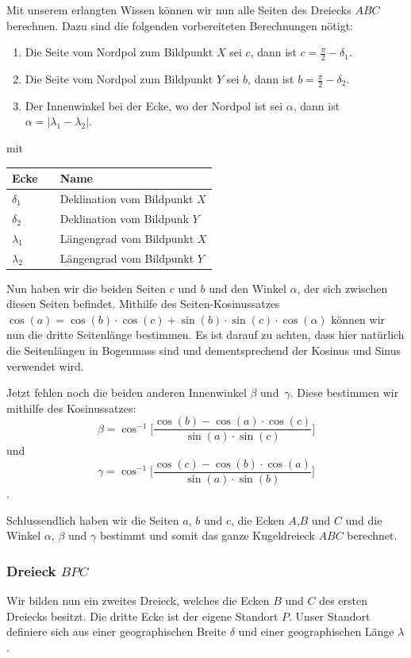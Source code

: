Mit unserem erlangten Wissen können wir nun alle Seiten des Dreiecks $ABC$ berechnen.
Dazu sind die folgenden vorbereiteten Berechnungen nötigt:

\begin{enumerate}
	\item Die Seite vom Nordpol zum Bildpunkt $X$ sei $c$, dann ist $c = \frac{\pi}{2} - \delta_1$.  
	\item Die Seite vom Nordpol zum Bildpunkt $Y$ sei $b$, dann ist $b = \frac{\pi}{2} - \delta_2$.
	\item Der Innenwinkel bei der Ecke, wo der Nordpol ist sei $\alpha$, dann ist $ \alpha = |\lambda_1 - \lambda_2|$.
\end{enumerate}

mit 
\begin{center}
	\begin{tabular}{ l l l }
		Ecke && Name  \\ 
		\hline
		$\delta_1$ && Deklination vom Bildpunkt $X$ \\  
		$\delta_2$ && Deklination vom Bildpunk $Y$ \\
		$\lambda_1 $&& Längengrad vom Bildpunkt $X$\\
		$\lambda_2$ && Längengrad vom Bildpunkt $Y$
	\end{tabular}
\end{center}

Nun haben wir die beiden Seiten $c$ und $b$ und den Winkel $\alpha$, der sich zwischen diesen Seiten befindet. 
Mithilfe des Seiten-Kosinussatzes 
$\cos(a) = \cos(b)\cdot \cos(c) + \sin(b) \cdot \sin(c)\cdot \cos(\alpha)$ 
können wir nun die dritte Seitenlänge bestimmen. 
Es ist darauf zu achten, dass hier natürlich die Seitenlängen in Bogenmass sind und dementsprechend der Kosinus und Sinus verwendet wird. 

Jetzt fehlen noch die beiden anderen Innenwinkel $\beta$ und\ $\gamma$.
Diese bestimmen wir mithilfe des Kosinussatzes: \[\beta=\cos^{-1}  \bigg[\frac{\cos(b)-\cos(a) \cdot \cos(c)}{\sin(a) \cdot \sin(c)}\bigg]\] und \[\gamma =  \cos^{-1}  \bigg[\frac{\cos(c)-\cos(b) \cdot \cos(a)}{\sin(a) \cdot \sin(b)}\bigg]\].

Schlussendlich haben wir die Seiten $a$, $b$ und $c$, die Ecken $A$,$B$ und $C$ und die Winkel $\alpha$, $\beta$  und  $\gamma$ bestimmt und somit das ganze Kugeldreieck $ABC$ berechnet.

\subsubsection{Dreieck $BPC$}
Wir bilden nun ein zweites Dreieck, welches die Ecken $B$ und $C$ des ersten Dreiecks besitzt. 
Die dritte Ecke ist der eigene Standort $P$.
Unser Standort definiere sich aus einer geographischen Breite $\delta$ und einer geographischen Länge $\lambda$. 

